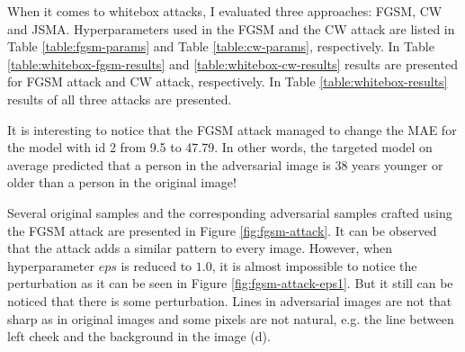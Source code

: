 When it comes to whitebox attacks, I evaluated three approaches: FGSM, CW and JSMA. Hyperparameters used in the FGSM and the CW attack are listed in Table \ref{table:fgsm-params} and Table \ref{table:cw-params}, respectively. In Table \ref{table:whitebox-fgsm-results} and \ref{table:whitebox-cw-results} results are presented for FGSM attack and CW attack, respectively. In Table \ref{table:whitebox-results} results of all three attacks are presented.

It is interesting to notice that the FGSM attack managed to change the MAE for the model with id 2 from 9.5 to 47.79. In other words, the targeted model on average predicted that a person in the adversarial image is 38 years younger or older than a person in the original image! 

Several original samples and the corresponding adversarial samples crafted using the FGSM attack are presented in Figure \ref{fig:fgsm-attack}. It can be observed that the attack adds a similar pattern to every image. However, when hyperparameter $eps$ is reduced to $1.0$, it is almost impossible to notice the perturbation as it can be seen in Figure \ref{fig:fgsm-attack-eps1}. But it still can be noticed that there is some perturbation. Lines in adversarial images are not that sharp as in original images and some pixels are not natural, e.g. the line between left cheek and the background in the image (d).


